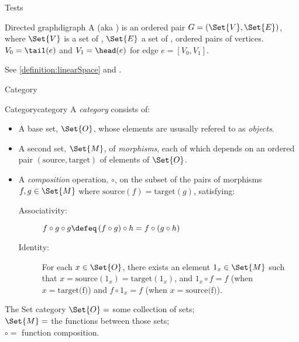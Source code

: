 \documentclass{PalisadesLakesBook}
\begin{document}
\begin{plSection}{Tests}
\begin{plDefinition*}{Directed graph}{digraph}
A  (aka ) is
an ordered pair $G=\left( \Set{V}, \Set{E} \right)$,
where $\Set{V}$ is a set of , 
$\Set{E}$ a set of , ordered pairs of vertices.
$V_0 = \tail(e)$ and $V_1 = \head(e)$
for edge $e = \left[ V_0, V_1 \right]$.
\end{plDefinition*}

See \cref{definition:linearSpace} 
and .

\begin{plSection}{Category}

\begin{plDefinition}{Category}{category}
A \textsl{category} consists of: 
\begin{itemize}
\item A base set, $\Set{O}$, 
whose elements are ususally refered to as \textit{objects}.
\item A second set, $\Set{M}$, of \textit{morphisms}, 
each of which depends on an ordered pair 
$\left( \text{source} , \text{target} \right)$ of elements of 
$\Set{O}$. 
\item A \textsl{composition} operation, $\circ$, on 
the subset of the pairs of morphisms $f , g \in \Set{M}$
where $\text{source}(f) = \text{target}(g)$, satisfying:
\begin{description}
\item[Associativity:] $f \circ g \circ g \defeq 
\left( f \circ g \right) \circ h 
= f \circ \left( g \circ h \right)$
\item[Identity:] For each $x \in \Set{O}$, there exists an element
$1_x \in \Set{M}$ such that 
$x = \text{source}(1_x) = \text{target}(1_x)$, and 
$1_x \circ f = f$ (when $x = \text{target(f)}$) and
$f \circ 1_x = f$ (when $x = \text{source(f)}$).
\end{description}
\end{itemize}
\end{plDefinition}

 \begin{plExample}{The Set category}{}
 $\Set{O} = $ some collection of sets;\\
 $\Set{M} = $ the functions between those sets;\\
 $\circ = $ function composition.  
 \end{plExample}
 

\end{plSection}
\end{plSection}
\end{document}
